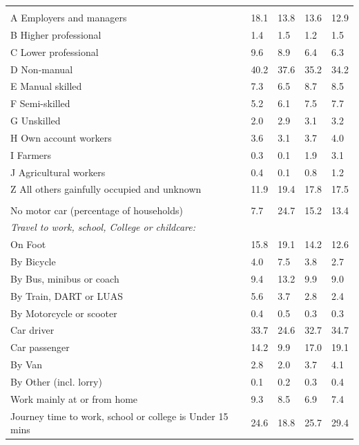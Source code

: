 \documentclass{article}
\begin{document}
\begin{table}[h]
\begin{tabular}{KTTTT}
\hline
    \\ 
    \hline
A Employers and managers & 18.1& 13.8& 13.6& 12.9\\
B Higher professional & 1.4& 1.5& 1.2& 1.5\\
C Lower professional & 9.6& 8.9& 6.4& 6.3\\
D Non-manual & 40.2& 37.6& 35.2& 34.2\\
E Manual skilled & 7.3& 6.5& 8.7& 8.5\\
F Semi-skilled & 5.2& 6.1& 7.5& 7.7\\
G Unskilled & 2.0& 2.9& 3.1& 3.2\\
H Own account workers & 3.6& 3.1& 3.7& 4.0\\
I Farmers & 0.3& 0.1& 1.9& 3.1\\
J Agricultural workers & 0.4& 0.1& 0.8& 1.2\\
Z All others gainfully occupied and unknown & 11.9& 19.4& 17.8& 17.5\\
\hline
{}\hline
    \\ 
    \hline
No motor car (percentage of households) &  7.7& 24.7& 15.2& 
13.4\\
    \hline 
\emph{Travel to work, school, College or childcare:} & & & \\
\quad On Foot & 15.8& 19.1& 14.2& 12.6\\ 
\quad By Bicycle & 4.0& 7.5& 3.8& 2.7\\ 
\quad By Bus, minibus or coach &  9.4& 13.2&  9.9&  9.0\\
\quad By Train, DART or LUAS & 5.6& 3.7& 2.8& 2.4\\
\quad By Motorcycle or scooter & 0.4& 0.5& 0.3& 0.3\\
\quad Car driver & 33.7 & 24.6& 32.7& 34.7\\
\quad Car passenger & 14.2&  9.9& 17.0& 19.1\\
\quad By Van & 2.8& 2.0& 3.7& 4.1\\
\quad By Other (incl. lorry) & 0.1& 0.2& 0.3& 0.4\\
    \hline
Work mainly at or from home & 9.3& 8.5& 6.9& 7.4\\
Journey time to work, school or college is Under 15 mins & 24.6& 18.8& 25.7& 29.4\\

\end{tabular}
\end{table}
\end{document}
